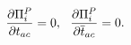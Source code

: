 \begin{equation}
{\partial \Pi^P_i\over\partial t_{ac}}=0,~~
{\partial \Pi^P_i\over\partial \overline{t}_{ac}}=0.
\label{acinv}
\end{equation}

